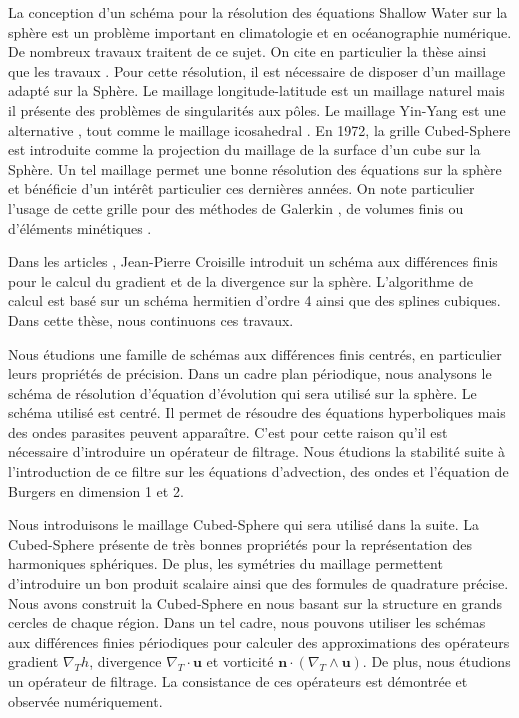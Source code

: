 
La conception d'un schéma pour la résolution des équations Shallow Water sur la sphère est un problème important en climatologie et en océanographie numérique. De nombreux travaux traitent de ce sujet. On cite en particulier la thèse \cite{Ullrich2011} ainsi que les travaux \cite{Nair2010, Qaddouri2012}.
Pour cette résolution, il est nécessaire de disposer d'un maillage adapté sur la Sphère. Le maillage longitude-latitude est un maillage naturel mais il présente des problèmes de singularités aux pôles. Le maillage Yin-Yang est une alternative \cite{Kageyama2004, Li2008}, tout comme le maillage icosahedral \cite{Stuhne1999}. 
En 1972, la grille Cubed-Sphere est introduite \cite{Sadourny1972} comme la projection du maillage de la surface d'un cube sur la Sphère. Un tel maillage permet une bonne résolution des équations sur la sphère \cite{Ronchi1996} et bénéficie d'un intérêt particulier ces dernières années. On note particulier l'usage de cette grille pour des méthodes de Galerkin \cite{Nair2010}, de volumes finis \cite{Ullrich2011, Chen2008} ou d'éléments minétiques \cite{Lauritzen2010}.

Dans les articles \cite{Croisille2015,Croisille2013}, Jean-Pierre Croisille introduit un schéma aux différences finis pour le calcul du gradient et de la divergence sur la sphère. L'algorithme de calcul est basé sur un schéma hermitien d'ordre 4 ainsi que des splines cubiques. Dans cette thèse, nous continuons ces travaux.

Nous étudions une famille de schémas aux différences finis centrés, en particulier leurs propriétés de précision. Dans un cadre plan périodique, nous analysons le schéma de résolution d'équation d'évolution qui sera utilisé sur la sphère. Le schéma utilisé est centré. Il permet de résoudre des équations hyperboliques mais des ondes parasites peuvent apparaître. C'est pour cette raison qu'il est nécessaire d'introduire un opérateur de filtrage. Nous étudions la stabilité suite à l'introduction de ce filtre sur les équations d'advection, des ondes et l'équation de Burgers en dimension 1 et 2.

Nous introduisons le maillage Cubed-Sphere qui sera utilisé dans la suite. La Cubed-Sphere présente de très bonnes propriétés pour la représentation des harmoniques sphériques. De plus, les symétries du maillage permettent d'introduire un bon produit scalaire ainsi que des formules de quadrature précise. Nous avons construit la Cubed-Sphere en nous basant sur la structure en grands cercles de chaque région. Dans un tel cadre, nous pouvons utiliser les schémas aux différences finies périodiques pour calculer des approximations des opérateurs gradient $\nabla_T h$, divergence $\nabla_T \cdot \mathbf{u}$ et vorticité $\mathbf{n} \cdot (\nabla_T \wedge \mathbf{u})$. De plus, nous étudions un opérateur de filtrage. La consistance de ces opérateurs est démontrée et observée numériquement.

